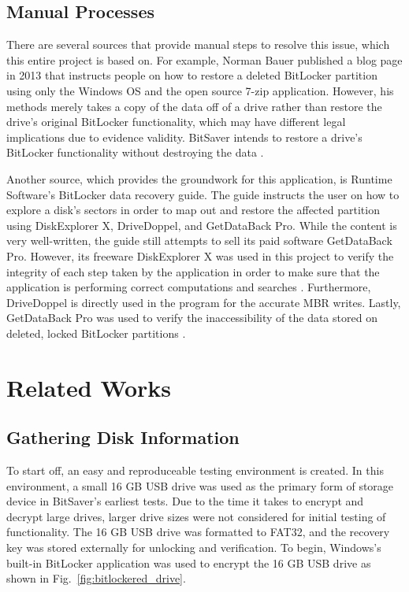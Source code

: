 \documentclass[conference]{IEEEtran} \IEEEoverridecommandlockouts
\begin{document}
\subsection{Manual Processes}

There are several sources that provide manual steps to resolve this issue, which
this entire project is based on. For example, Norman Bauer published a blog
page in 2013 that instructs people on how to restore a deleted BitLocker partition using
only the Windows OS and the open source 7-zip application. However, his methods
merely takes a copy of the data off of a drive rather than
restore the drive's original BitLocker functionality, which may have different legal
implications due to evidence validity. BitSaver intends to restore a drive's
BitLocker functionality without destroying the data \cite{b2}.

Another source, which provides the groundwork for this application, is Runtime
Software's BitLocker data recovery guide. The guide instructs the user on how to
explore a disk's sectors in order to map out and restore the affected partition 
using DiskExplorer X, DriveDoppel, and GetDataBack Pro.
While the content is very well-written, the guide still attempts to sell its
paid software GetDataBack Pro. However, its freeware DiskExplorer X was used in
this project to verify the integrity of each step taken by the application in
order to make sure that the application is performing correct computations and searches \cite{b6}.
Furthermore, DriveDoppel is directly used in the program for the accurate MBR
writes. Lastly, GetDataBack Pro was used to verify the inaccessibility of
the data stored on deleted, locked BitLocker partitions \cite{b1}.

\section{Related Works} 

\subsection{Gathering Disk Information} 

To start off, an easy and
reproduceable testing environment is created. In this environment, a small 16 GB USB drive was
used as the primary form of storage device in BitSaver's earliest tests. Due to the time it
takes to encrypt and decrypt large drives, larger drive sizes were not
considered for initial testing of functionality. The 16 GB USB drive was formatted to FAT32, and the
recovery key was stored externally for unlocking and verification. To begin, Windows's built-in
BitLocker application was used to encrypt the 16 GB USB drive as shown in
Fig.~\ref{fig:bitlockered_drive}.
\end{document}
